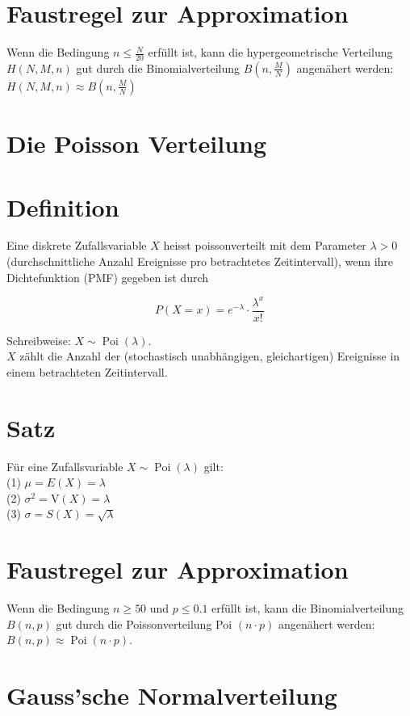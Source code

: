 \documentclass[10pt]{article}
\begin{document}
\section*{Faustregel zur Approximation}
Wenn die Bedingung $n \leq \frac{N}{20}$ erfüllt ist, kann die hypergeometrische Verteilung $H(N, M, n)$ gut durch die Binomialverteilung $B\left(n, \frac{M}{N}\right)$ angenähert werden: $H(N, M, n) \approx B\left(n, \frac{M}{N}\right)$

\section*{Die Poisson Verteilung}
\section*{Definition}
Eine diskrete Zufallsvariable $X$ heisst poissonverteilt mit dem Parameter $\lambda>0$ (durchschnittliche Anzahl Ereignisse pro betrachtetes Zeitintervall), wenn ihre Dichtefunktion (PMF) gegeben ist durch

$$
P(X=x)=e^{-\lambda} \cdot \frac{\lambda^{x}}{x!}
$$

Schreibweise: $X \sim \operatorname{Poi}(\lambda)$.\\
$X$ zählt die Anzahl der (stochastisch unabhängigen, gleichartigen) Ereignisse in einem betrachteten Zeitintervall.

\section*{Satz}
Für eine Zufallsvariable $X \sim \operatorname{Poi}(\lambda)$ gilt:\\
(1) $\mu=E(X)=\lambda$\\
(2) $\sigma^{2}=\mathrm{V}(X)=\lambda$\\
(3) $\sigma=S(X)=\sqrt{\lambda}$

\section*{Faustregel zur Approximation}
Wenn die Bedingung $n \geq 50$ und $p \leq 0.1$ erfüllt ist, kann die Binomialverteilung $B(n, p)$ gut durch die Poissonverteilung Poi $(n \cdot p)$ angenähert werden: $B(n, p) \approx \operatorname{Poi}(n \cdot p)$.

\section*{Gauss'sche Normalverteilung}
\end{document}
